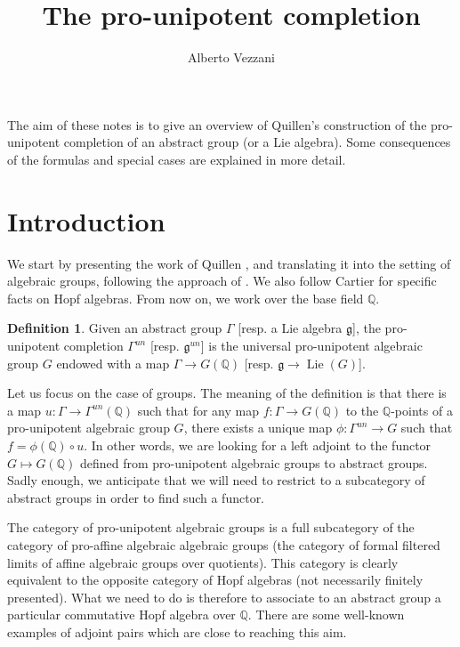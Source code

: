 \documentclass{amsart}
\theoremstyle{definition}
\newtheorem{dfn}[thm]{Definition}
\theoremstyle{remark}
\theoremstyle{remark}
\newcommand{\Q}{\mathbb{Q}}
\newcommand{\ra}{\rightarrow}
\newcommand{\mfg}{\mathfrak{g}}
\DeclareMathOperator{\Lie}{Lie}
\begin{document}
%
\title{The pro-unipotent completion}%
\author{Alberto Vezzani}%
\maketitle

The aim of these notes is to give an overview of Quillen's construction of the pro-unipotent completion of an abstract group (or a Lie algebra). Some consequences of the formulas and special cases are explained in more detail.

\section{Introduction}

We start by presenting the work of Quillen \cite[Appendix A]{quillen-r}, and translating it into the setting of algebraic groups, following the approach of \cite{em}. We also follow Cartier \cite{cartier-ha} for specific facts on Hopf algebras.
From now on, we work over the base field $\Q$. %

\begin{dfn}
Given an abstract group $\Gamma$ [resp. a Lie algebra $\mfg$], the pro-unipotent completion $\Gamma^{un}$ [resp. $\mfg^{un}$] is the universal pro-unipotent algebraic group $G$ endowed with a map $\Gamma\ra G(\Q)$ [resp. $\mfg\ra\Lie(G)$]. 
\end{dfn}

Let us focus on the case of groups. The meaning of the definition is that there is a map $u\colon\Gamma\ra\Gamma^{un}(\Q)$ such that for any map $f\colon\Gamma\ra G(\Q)$ to the $\Q$-points of a pro-unipotent algebraic group $G$, there exists a unique map $\phi\colon\Gamma^{un}\ra G$ such that $f=\phi(\Q)\circ u$. In other words, we are looking for a left adjoint to the functor $G\mapsto G(\Q)$ defined from pro-unipotent algebraic groups to abstract groups. Sadly enough, we anticipate that we will need to restrict to a subcategory of abstract groups in order to find such a functor.

The category of pro-unipotent algebraic groups is a full subcategory of the category of pro-affine algebraic algebraic groups (the category of formal filtered limits of affine algebraic groups over quotients). This category is clearly equivalent to the opposite category of Hopf algebras (not necessarily finitely presented). What we need to do is therefore to associate to an abstract group a particular commutative Hopf algebra over $\Q$. There are some well-known examples of adjoint pairs which are close to reaching this aim.
\end{document}
